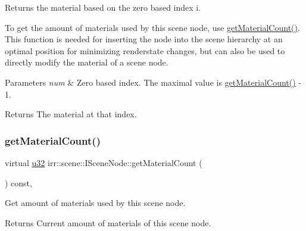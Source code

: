 Returns the material based on the zero based index i. 

To get the amount of materials used by this scene node, use \hyperlink{classirr_1_1scene_1_1ISceneNode_a8e75e9baede63e31e6aa6e42e6c8ddfe}{get\+Material\+Count()}. This function is needed for inserting the node into the scene hierarchy at an optimal position for minimizing renderstate changes, but can also be used to directly modify the material of a scene node. 
\begin{DoxyParams}{Parameters}
{\em num} & Zero based index. The maximal value is \hyperlink{classirr_1_1scene_1_1ISceneNode_a8e75e9baede63e31e6aa6e42e6c8ddfe}{get\+Material\+Count()} -\/ 1. \\
\hline
\end{DoxyParams}
\begin{DoxyReturn}{Returns}
The material at that index. 
\end{DoxyReturn}
\mbox{\label{classirr_1_1scene_1_1ISceneNode_a8e75e9baede63e31e6aa6e42e6c8ddfe}} 
\subsubsection{\texorpdfstring{get\+Material\+Count()}{getMaterialCount()}}
{\footnotesize\ttfamily virtual \hyperlink{namespaceirr_a0416a53257075833e7002efd0a18e804}{u32} irr\+::scene\+::\+I\+Scene\+Node\+::get\+Material\+Count (\begin{DoxyParamCaption}{ }\end{DoxyParamCaption}) const\hspace{0.3cm}{\ttfamily [inline]}, {\ttfamily [virtual]}}



Get amount of materials used by this scene node. 

\begin{DoxyReturn}{Returns}
Current amount of materials of this scene node. 
\end{DoxyReturn}
\mbox{\label{classirr_1_1scene_1_1ISceneNode_ab0e72b38949f926a1929468cd2b1ce16}} 
